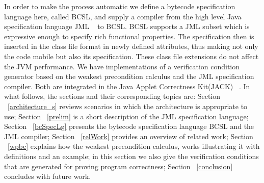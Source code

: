    In order to make the process automatic we define a bytecode specification language here, called BCSL, and supply a compiler from 
 the high level Java specification language JML ~\cite{JMLRefMan} to BCSL. 
 BCSL supports a JML subset which is expressive enough to specify rich functional properties. The specification then is 
 inserted in the class file format in newly defined attributes, thus making not only the code mobile but also its specification. These class
 file extensions do not affect the JVM performance. 
  We have implementations of a verification condition generator based on the weakest precondition calculus and the JML 
specification compiler. Both are integrated in the Java Applet Correctness Kit(JACK) ~\cite{BRL-JACK}.
  In what follows, the sections and their corresponding topics are: 
Section ~\ref{architecture_s} reviews scenarios in which the architecture is appropriate to use; Section  ~\ref{prelim} is a short description of the JML specification language; Section ~\ref{bcSpecLg} presents the bytecode 
specification language BCSL and the JML compiler; Section ~\ref{relWork} provides an overview of related work; Section ~\ref{wpbc} explains how the weakest precondition calculus, works illustrating it with definitions and an example; in this section we also give the verification conditions that are generated for 
proving program correctness; Section ~\ref{conclusion} concludes with future work.  
















